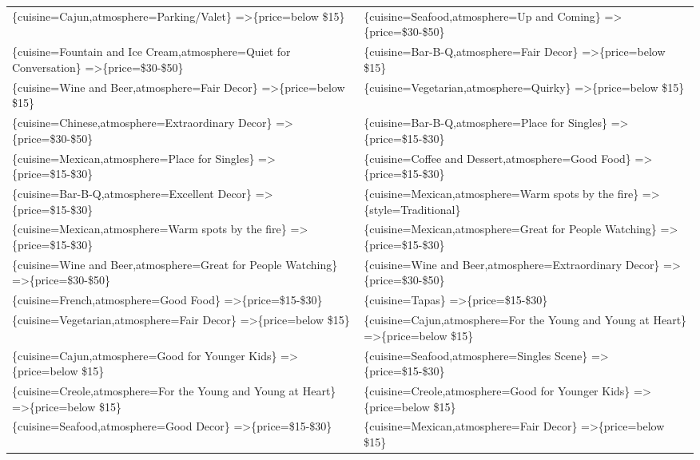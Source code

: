 \documentclass[letterpaper,10pt]{article}
\begin{document}
\begin{appendices}
\begin{table}[h]
\begin{adjustbox}{max width=\textwidth}
\begin{tabular}{ll}
\{cuisine=Cajun,atmosphere=Parking/Valet\} =\textgreater \{price=below \$15\} & \{cuisine=Seafood,atmosphere=Up and Coming\} =\textgreater \{price=\$30-\$50\} \\
\{cuisine=Fountain and Ice Cream,atmosphere=Quiet for Conversation\} =\textgreater \{price=\$30-\$50\} & \{cuisine=Bar-B-Q,atmosphere=Fair Decor\} =\textgreater \{price=below \$15\} \\
\{cuisine=Wine and Beer,atmosphere=Fair Decor\} =\textgreater \{price=below \$15\} & \{cuisine=Vegetarian,atmosphere=Quirky\} =\textgreater \{price=below \$15\} \\
\{cuisine=Chinese,atmosphere=Extraordinary Decor\} =\textgreater \{price=\$30-\$50\} & \{cuisine=Bar-B-Q,atmosphere=Place for Singles\} =\textgreater \{price=\$15-\$30\} \\
\{cuisine=Mexican,atmosphere=Place for Singles\} =\textgreater \{price=\$15-\$30\} & \{cuisine=Coffee and Dessert,atmosphere=Good Food\} =\textgreater \{price=\$15-\$30\} \\
\{cuisine=Bar-B-Q,atmosphere=Excellent Decor\} =\textgreater \{price=\$15-\$30\} & \{cuisine=Mexican,atmosphere=Warm spots by the fire\} =\textgreater \{style=Traditional\} \\
\{cuisine=Mexican,atmosphere=Warm spots by the fire\} =\textgreater \{price=\$15-\$30\} & \{cuisine=Mexican,atmosphere=Great for People Watching\} =\textgreater \{price=\$15-\$30\} \\
\{cuisine=Wine and Beer,atmosphere=Great for People Watching\} =\textgreater \{price=\$30-\$50\} & \{cuisine=Wine and Beer,atmosphere=Extraordinary Decor\} =\textgreater \{price=\$30-\$50\} \\
\{cuisine=French,atmosphere=Good Food\} =\textgreater \{price=\$15-\$30\} & \{cuisine=Tapas\} =\textgreater \{price=\$15-\$30\} \\
\{cuisine=Vegetarian,atmosphere=Fair Decor\} =\textgreater \{price=below \$15\} & \{cuisine=Cajun,atmosphere=For the Young and Young at Heart\} =\textgreater \{price=below \$15\} \\
\{cuisine=Cajun,atmosphere=Good for Younger Kids\} =\textgreater \{price=below \$15\} & \{cuisine=Seafood,atmosphere=Singles Scene\} =\textgreater \{price=\$15-\$30\} \\
\{cuisine=Creole,atmosphere=For the Young and Young at Heart\} =\textgreater \{price=below \$15\} & \{cuisine=Creole,atmosphere=Good for Younger Kids\} =\textgreater \{price=below \$15\} \\
\{cuisine=Seafood,atmosphere=Good Decor\} =\textgreater \{price=\$15-\$30\} & \{cuisine=Mexican,atmosphere=Fair Decor\} =\textgreater \{price=below \$15\} \\

\end{tabular}
\end{adjustbox}
\end{table}
\end{appendices}
\end{document}
